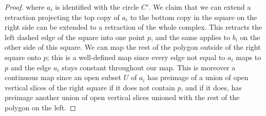 \documentclass[12pt]{article}
\theoremstyle{remark}
\begin{document}
\begin{proof}
  where $a_i$ is identified with the circle $C'$. We claim that we can extend a retraction projecting the top copy of $a_i$ to the bottom copy in the square on the right side can be extended to a retraction of the whole complex. This retracts the left dashed edge of the square into one point $p$, and the same applies to $b_i$ on the other side of this square. We can map the rest of the polygon outside of the right square onto $p$; this is a well-defined map since every edge not equal to $a_i$ maps to $p$ and the edge $a_i$ stays constant throughout our map. This is moreover a continuous map since an open subset $U$ of $a_i$ has preimage of a union of open vertical slices of the right square if it does not contain $p$, and if it does, has preimage another union of open vertical slices unioned with the rest of the polygon on the left.
\end{proof}
\end{document}
